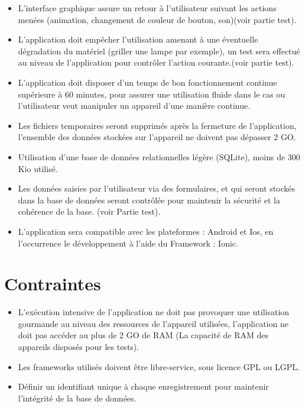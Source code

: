 \documentclass[12pt,a4paper]{article}
\begin{document}
\begin{itemize}
\item L'interface graphique assure un retour à l'utilisateur suivant les actions menées (animation, changement de couleur de bouton, son)(voir partie test).  
\item L'application doit empêcher l'utilisation amenant à une éventuelle dégradation du matériel (griller une lampe par exemple), un test sera effectué au niveau de l'application pour contrôler l'action courante.(voir partie test).
\item L'application doit disposer d'un temps de bon fonctionnement continue supérieure à 60 minutes, pour assurer une utilisation fluide dans le cas ou l'utilisateur veut manipuler un appareil d'une manière continue.
\item Les fichiers temporaires seront supprimés après la fermeture de l'application, l'ensemble des données stockées sur l'appareil ne doivent pas dépasser 2 GO.
\item Utilisation d'une base de données relationnelles légère (SQLite), moins de 300 Kio utilisé.
\item Les données saisies par l'utilisateur via des formulaires, et qui seront stockés dans la base de données seront contrôlée pour maintenir la sécurité et la cohérence de la base. (voir Partie test).
\item L'application sera compatible avec les plateformes : Android et Ios, en l'occurrence le développement à l'aide du Framework : Ionic.
\end{itemize}

\section{Contraintes}

\begin{itemize}

\item L'exécution intensive de l'application ne doit pas provoquer une utilisation gourmande au niveau des ressources de l'appareil utilisées, l'application ne doit pas accéder au plus de 2 GO de RAM (La capacité de RAM des appareils disposés pour les tests).
\item Les frameworks utilisés doivent être libre-service, sous licence GPL ou LGPL.
\item Définir un identifiant unique à chaque enregistrement pour maintenir l'intégrité de la base de données.

\end{itemize}
\end{document}
